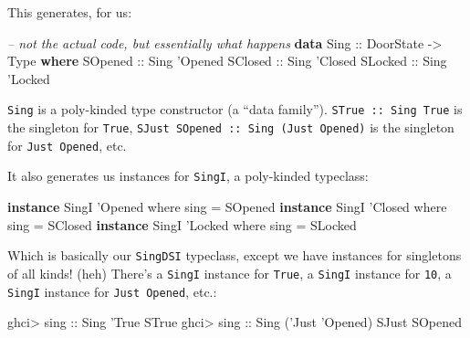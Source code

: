 \documentclass[]{article}
\newenvironment{Shaded}{}{}
\newcommand{\KeywordTok}[1]{\textcolor[rgb]{0.00,0.44,0.13}{\textbf{#1}}}
\newcommand{\DataTypeTok}[1]{\textcolor[rgb]{0.56,0.13,0.00}{#1}}
\newcommand{\CharTok}[1]{\textcolor[rgb]{0.25,0.44,0.63}{#1}}
\newcommand{\CommentTok}[1]{\textcolor[rgb]{0.38,0.63,0.69}{\textit{#1}}}
\newcommand{\OtherTok}[1]{\textcolor[rgb]{0.00,0.44,0.13}{#1}}
\newcommand{\FunctionTok}[1]{\textcolor[rgb]{0.02,0.16,0.49}{#1}}
\newcommand{\NormalTok}[1]{#1}
\begin{document}
This generates, for us:

\begin{Shaded}
\begin{Highlighting}[]
\CommentTok{-- not the actual code, but essentially what happens}
\KeywordTok{data} \DataTypeTok{Sing}\OtherTok{ ::} \DataTypeTok{DoorState} \OtherTok{->} \DataTypeTok{Type} \KeywordTok{where}
    \DataTypeTok{SOpened}\OtherTok{ ::} \DataTypeTok{Sing} \CharTok{'Opened}
    \DataTypeTok{SClosed}\OtherTok{ ::} \DataTypeTok{Sing} \CharTok{'Closed}
    \DataTypeTok{SLocked}\OtherTok{ ::} \DataTypeTok{Sing} \CharTok{'Locked}
\end{Highlighting}
\end{Shaded}

\texttt{Sing} is a poly-kinded type constructor (a ``data family'').
\texttt{STrue\ ::\ Sing\ \textquotesingle{}True} is the singleton for
\texttt{\textquotesingle{}True},
\texttt{SJust\ SOpened\ ::\ Sing\ (\textquotesingle{}Just\ \textquotesingle{}Opened)}
is the singleton for \texttt{\textquotesingle{}Just\ \textquotesingle{}Opened},
etc.

It also generates us instances for \texttt{SingI}, a poly-kinded typeclass:

\begin{Shaded}
\begin{Highlighting}[]
\KeywordTok{instance} \DataTypeTok{SingI} \CharTok{'Opened where}
\NormalTok{    sing }\FunctionTok{=} \DataTypeTok{SOpened}
\KeywordTok{instance} \DataTypeTok{SingI} \CharTok{'Closed where}
\NormalTok{    sing }\FunctionTok{=} \DataTypeTok{SClosed}
\KeywordTok{instance} \DataTypeTok{SingI} \CharTok{'Locked where}
\NormalTok{    sing }\FunctionTok{=} \DataTypeTok{SLocked}
\end{Highlighting}
\end{Shaded}

Which is basically our \texttt{SingDSI} typeclass, except we have instances for
singletons of all kinds! (heh) There's a \texttt{SingI} instance for
\texttt{\textquotesingle{}True}, a \texttt{SingI} instance for \texttt{10}, a
\texttt{SingI} instance for
\texttt{\textquotesingle{}Just\ \textquotesingle{}Opened}, etc.:

\begin{Shaded}
\begin{Highlighting}[]
\NormalTok{ghci}\FunctionTok{>}\OtherTok{ sing ::} \DataTypeTok{Sing} \CharTok{'True}
\DataTypeTok{STrue}
\NormalTok{ghci}\FunctionTok{>}\OtherTok{ sing ::} \DataTypeTok{Sing}\NormalTok{ (}\CharTok{'Just '}\DataTypeTok{Opened}\NormalTok{)}
\DataTypeTok{SJust} \DataTypeTok{SOpened}
\end{Highlighting}
\end{Shaded}
\end{document}
